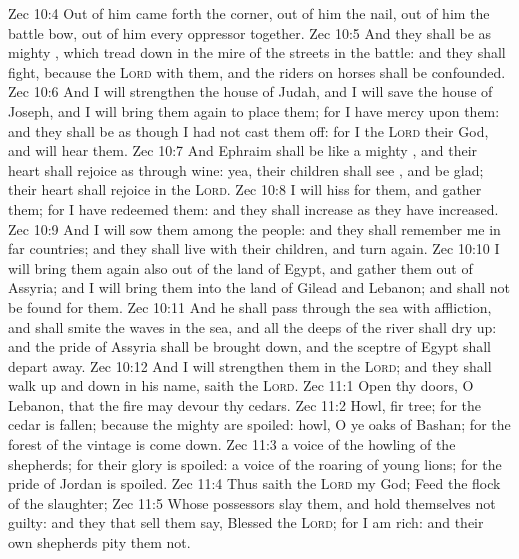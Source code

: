 \vs Zec 10:4 Out of him came forth the corner, out of him the nail, out of him the battle bow, out of him every oppressor together.
\vs Zec 10:5 And they shall be as mighty , which tread down  in the mire of the streets in the battle: and they shall fight, because the \textsc{Lord}  with them, and the riders on horses shall be confounded.
\vs Zec 10:6 And I will strengthen the house of Judah, and I will save the house of Joseph, and I will bring them again to place them; for I have mercy upon them: and they shall be as though I had not cast them off: for I  the \textsc{Lord} their God, and will hear them.
\vs Zec 10:7 And  Ephraim shall be like a mighty , and their heart shall rejoice as through wine: yea, their children shall see , and be glad; their heart shall rejoice in the \textsc{Lord}.
\vs Zec 10:8 I will hiss for them, and gather them; for I have redeemed them: and they shall increase as they have increased.
\vs Zec 10:9 And I will sow them among the people: and they shall remember me in far countries; and they shall live with their children, and turn again.
\vs Zec 10:10 I will bring them again also out of the land of Egypt, and gather them out of Assyria; and I will bring them into the land of Gilead and Lebanon; and  shall not be found for them.
\vs Zec 10:11 And he shall pass through the sea with affliction, and shall smite the waves in the sea, and all the deeps of the river shall dry up: and the pride of Assyria shall be brought down, and the sceptre of Egypt shall depart away.
\vs Zec 10:12 And I will strengthen them in the \textsc{Lord}; and they shall walk up and down in his name, saith the \textsc{Lord}.
\vs Zec 11:1 Open thy doors, O Lebanon, that the fire may devour thy cedars.
\vs Zec 11:2 Howl, fir tree; for the cedar is fallen; because the mighty are spoiled: howl, O ye oaks of Bashan; for the forest of the vintage is come down.
\vs Zec 11:3  a voice of the howling of the shepherds; for their glory is spoiled: a voice of the roaring of young lions; for the pride of Jordan is spoiled.
\vs Zec 11:4 Thus saith the \textsc{Lord} my God; Feed the flock of the slaughter;
\vs Zec 11:5 Whose possessors slay them, and hold themselves not guilty: and they that sell them say, Blessed  the \textsc{Lord}; for I am rich: and their own shepherds pity them not.
